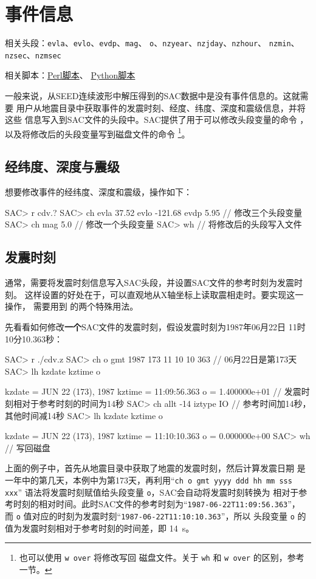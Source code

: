 \section{事件信息}
\label{sec:event-info}
相关头段：\texttt{evla}、\texttt{evlo}、\texttt{evdp}、\texttt{mag}、
    \texttt{o}、\texttt{nzyear}、\texttt{nzjday}、\texttt{nzhour}、
    \texttt{nzmin}、\texttt{nzsec}、\texttt{nzmsec}

相关脚本：\hyperref[subsec:event-info-perl]{Perl脚本}、
          \hyperref[subsec:event-info-python]{Python脚本}

一般来说，从SEED连续波形中解压得到的SAC数据中是没有事件信息的。这就需要
用户从地震目录中获取事件的发震时刻、经度、纬度、深度和震级信息，并将这些
信息写入到SAC文件的头段中。SAC提供了用于可以修改头段变量的命令
，以及将修改后的头段变量写到磁盘文件的命令
\footnote{也可以使用 \texttt{w over} 将修改写回
磁盘文件。关于 \texttt{wh} 和 \texttt{w over} 的区别，参考
 一节。}。

\subsection{经纬度、深度与震级}
想要修改事件的经纬度、深度和震级，操作如下：
\begin{SACCode}
SAC> r cdv.?
SAC> ch evla 37.52 evlo -121.68 evdp 5.95   // 修改三个头段变量
SAC> ch mag 5.0                             // 修改一个头段变量
SAC> wh                                     // 将修改后的头段写入文件
\end{SACCode}

\subsection{发震时刻}
通常，需要将发震时刻信息写入SAC头段，并设置SAC文件的参考时刻为发震时刻。
这样设置的好处在于，可以直观地从X轴坐标上读取震相走时。要实现这一操作，
需要用到  的两个特殊用法。

先看看如何修改\textbf{一个}SAC文件的发震时刻，假设发震时刻为1987年06月22日
11时10分10.363秒：
\label{code:origin-time}
\begin{SACCode}
SAC> r ./cdv.z
SAC> ch o gmt 1987 173 11 10 10 363   // 06月22日是第173天
SAC> lh kzdate kztime o

     kzdate = JUN 22 (173), 1987
     kztime = 11:09:56.363
          o = 1.400000e+01       // 发震时刻相对于参考时刻的时间为14秒
SAC> ch allt -14 iztype IO       // 参考时间加14秒，其他时间减14秒
SAC> lh kzdate kztime o

     kzdate = JUN 22 (173), 1987
     kztime = 11:10:10.363
          o = 0.000000e+00
SAC> wh                          // 写回磁盘
\end{SACCode}
上面的例子中，首先从地震目录中获取了地震的发震时刻，然后计算发震日期
是一年中的第几天，本例中为第173天，再利用``\texttt{ch o gmt yyyy ddd hh mm sss xxx}''
语法将发震时刻赋值给头段变量 \texttt{o}，SAC会自动将发震时刻转换为
相对于参考时刻的相对时间。此时SAC文件的参考时刻为``\texttt{1987-06-22T11:09:56.363}''，
而 \texttt{o} 值对应的时刻为发震时刻``\texttt{1987-06-22T11:10:10.363}''，所以
头段变量 \texttt{o} 的值为发震时刻相对于参考时刻的时间差，即 \SI{14}{\s}。

